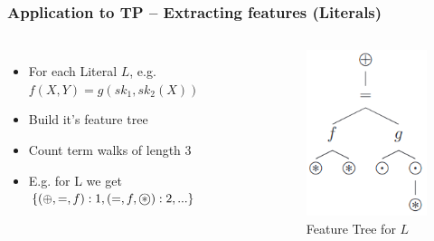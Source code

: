 \documentclass{beamer}
\newcommand\oast{\stackMath\mathbin{\stackinset{c}{0ex}{c}{0ex}{\ast}{\bigcirc}}}
\begin{document}
\begin{frame}
    \frametitle{Application to TP -- Extracting features (Literals)}
    \begin{columns}
    \begin{itemize}
        \item For each Literal $L$, e.g. $f(X, Y) = g(sk_1, sk_2(X))$
        \item Build it's feature tree
        \item Count term walks of length 3
        \item E.g. for L we get {\small$\{(\oplus, =, f): 1, (=, f, \oast):2, ...\}$}
    \end{itemize}
    \begin{figure}
    \includegraphics[width=\textwidth]{AST.png}
    \caption{Feature Tree for $L$}
    \end{figure}
    \end{columns}
    \let\thefootnote\relax{}

\end{frame}
\end{document}
